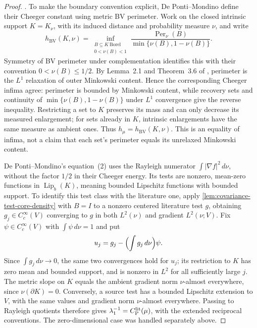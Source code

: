\begin{proof}
  \cite{Milman2009Isoperimetric,Bobkov1999LogConcave,
        Klartag2023Logarithmic,DePontiMondino2021}.
  To make the boundary convention explicit, De Ponti--Mondino define their Cheeger constant
  using metric BV perimeter. Work on the closed intrinsic support $K=K_\nu$, with its induced
  distance and probability measure $\nu$, and write
  \[
    h_{\mathrm{BV}}(K,\nu)
      =\inf_{\substack{B\subseteq K\ \mathrm{Borel}\\0<\nu(B)<1}}
        \frac{\operatorname{Per}_\nu(B)}{\min\{\nu(B),1-\nu(B)\}}.
  \]
  Symmetry of BV perimeter under complementation identifies this with their convention
  $0<\nu(B)\le1/2$. By Lemma~2.1 and Theorem~3.6 of
  \cite{AmbrosioDiMarinoGigli2017Minkowski}, perimeter is the $L^1$ relaxation of outer
  Minkowski content. Hence the corresponding Cheeger infima agree: perimeter is bounded by
  Minkowski content, while recovery sets and continuity of
  $\min\{\nu(B),1-\nu(B)\}$ under $L^1$ convergence give the reverse inequality.
  Restricting a set to $K$ preserves its mass and can only decrease its measured enlargement;
  for sets already in $K$, intrinsic enlargements have the same measure as ambient ones.
  Thus $h_\mu=h_{\mathrm{BV}}(K,\nu)$. This is an equality of infima, not a claim that each
  set's perimeter equals its unrelaxed Minkowski content.

  De Ponti--Mondino's equation~(2) uses the Rayleigh numerator $\int|\nabla f|^2\,d\nu$,
  without the factor $1/2$ in their Cheeger energy. Its tests are nonzero, mean-zero functions
  in $\operatorname{Lip}_b(K)$, meaning bounded Lipschitz functions with bounded support.
  To identify this test class with the literature one, apply
  \cref{lem:covariance-test-core-density} with $B=I$ to a nonzero centered literature test
  $g$, obtaining $g_j\in C_c^\infty(V)$ converging to $g$ in both $L^2(\nu)$ and gradient
  $L^2(\nu;V)$. Fix $\psi\in C_c^\infty(V)$ with $\int\psi\,d\nu=1$ and put
  \[
    u_j=g_j-\Bigl(\int g_j\,d\nu\Bigr)\psi.
  \]
  Since $\int g_j\,d\nu\to0$, the same two convergences hold for $u_j$; its restriction to
  $K$ has zero mean and bounded support, and is nonzero in $L^2$ for all sufficiently large
  $j$. The metric slope on $K$ equals the ambient gradient norm $\nu$-almost everywhere,
  since $\nu(\partial K)=0$. Conversely, a source test has a bounded Lipschitz extension
  to $V$, with the same values and gradient norm $\nu$-almost everywhere. Passing to
  Rayleigh quotients therefore gives $\lambda_1^{-1}=C_{\mathrm P}^{\mathrm{lit}}(\mu)$, with the extended
  reciprocal conventions. The zero-dimensional case was handled separately above.


\end{proof}

